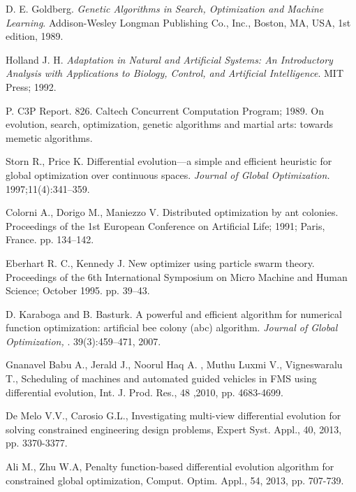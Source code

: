 

\begin{thebibliography}{9}
    D. E. Goldberg.
    \textit{Genetic Algorithms in Search, Optimization and Machine Learning}. 
    Addison-Wesley Longman Publishing Co., Inc., Boston, MA, USA, 1st edition, 1989.

    Holland J. H.
    \textit{Adaptation in Natural and Artificial Systems: An Introductory Analysis with Applications to Biology, Control, and Artificial Intelligence}. 
    MIT Press; 1992.
    
     P. C3P Report. 826. Caltech Concurrent Computation Program; 1989. On evolution, search, optimization, genetic algorithms and martial arts: towards memetic algorithms. 

    Storn R., Price K. Differential evolution—a simple and efficient heuristic for global optimization over continuous spaces. 
    \textit{Journal of Global Optimization.}
    1997;11(4):341–359.      
     
    Colorni A., Dorigo M., Maniezzo V. Distributed optimization by ant colonies. Proceedings of the 1st European Conference on Artificial Life; 1991; Paris, France. pp. 134–142.
    
    Eberhart R. C., Kennedy J. New optimizer using particle swarm theory. Proceedings of the 6th International Symposium on Micro Machine and Human Science; October 1995. pp. 39–43.    

    D. Karaboga and B. Basturk. A powerful and efficient algorithm for numerical function optimization: artificial bee colony (abc) algorithm. 
    \textit{Journal of Global Optimization, }. 
    39(3):459–471, 2007.    

    Gnanavel Babu A., Jerald J., Noorul Haq A. , Muthu Luxmi V., Vigneswaralu T., Scheduling of machines and automated guided vehicles in FMS using differential evolution, Int. J. Prod. Res., 48 ,2010, pp. 4683-4699.
    
    De Melo V.V., Carosio G.L., Investigating multi-view differential evolution for solving constrained engineering design problems, Expert Syst. Appl., 40, 2013, pp. 3370-3377.

    Ali M., Zhu W.A, Penalty function-based differential evolution algorithm for constrained global optimization, Comput. Optim. Appl., 54, 2013, pp. 707-739.


\end{thebibliography}
